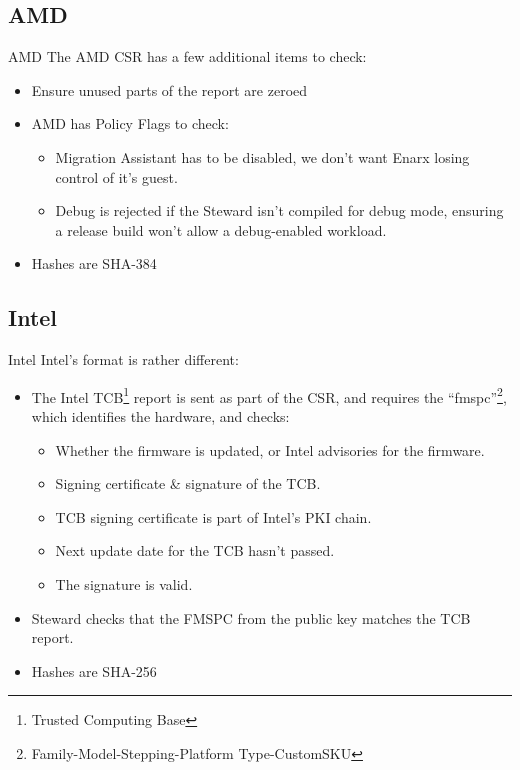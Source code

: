 \documentclass[graphics,compress]{beamer}
\begin{document}
\subsection{AMD}
\begin{frame}{AMD}
The AMD CSR has a few additional items to check:
\begin{itemize}
    \item Ensure unused parts of the report are zeroed
    \item AMD has Policy Flags to check:
    \begin{itemize}
        \item Migration Assistant has to be disabled, we don't want Enarx losing control of it's guest.
        \item Debug is rejected if the Steward isn't compiled for debug mode, ensuring a release build won't allow a debug-enabled workload.
    \end{itemize}
    \item Hashes are SHA-384
\end{itemize}
\end{frame}

\subsection{Intel}
\begin{frame}{Intel}
Intel's format is rather different:
\begin{itemize}
    \item The Intel TCB\footnote{Trusted Computing Base} report is sent as part of the CSR, and requires the ``fmspc''\footnote{Family-Model-Stepping-Platform Type-CustomSKU}, which identifies the hardware, and checks:
    \begin{itemize}
        \item Whether the firmware is updated, or Intel advisories for the firmware.
        \item Signing certificate \& signature of the TCB.
        \item TCB signing certificate is part of Intel's PKI chain.
        \item Next update date for the TCB hasn't passed.
        \item The signature is valid.
    \end{itemize}
    \item Steward checks that the FMSPC from the public key matches the TCB report.
    \item Hashes are SHA-256
\end{itemize}
\end{frame}
\end{document}
